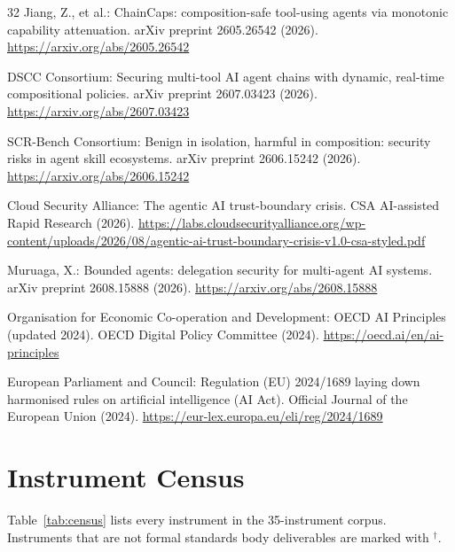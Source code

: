 \documentclass[runningheads]{llncs}
\begin{document}
\begin{thebibliography}{32}
Jiang, Z., et al.: ChainCaps: composition-safe tool-using agents via monotonic capability attenuation. arXiv preprint 2605.26542 (2026). \url{https://arxiv.org/abs/2605.26542}

DSCC Consortium: Securing multi-tool AI agent chains with dynamic, real-time compositional policies. arXiv preprint 2607.03423 (2026). \url{https://arxiv.org/abs/2607.03423}

SCR-Bench Consortium: Benign in isolation, harmful in composition: security risks in agent skill ecosystems. arXiv preprint 2606.15242 (2026). \url{https://arxiv.org/abs/2606.15242}

Cloud Security Alliance: The agentic AI trust-boundary crisis. CSA AI-assisted Rapid Research (2026). \url{https://labs.cloudsecurityalliance.org/wp-content/uploads/2026/08/agentic-ai-trust-boundary-crisis-v1.0-csa-styled.pdf}

Muruaga, X.: Bounded agents: delegation security for multi-agent AI systems. arXiv preprint 2608.15888 (2026). \url{https://arxiv.org/abs/2608.15888}

Organisation for Economic Co-operation and Development: OECD AI Principles (updated 2024). OECD Digital Policy Committee (2024). \url{https://oecd.ai/en/ai-principles}

European Parliament and Council: Regulation (EU) 2024/1689 laying down harmonised rules on artificial intelligence (AI Act). Official Journal of the European Union (2024). \url{https://eur-lex.europa.eu/eli/reg/2024/1689}

\end{thebibliography}

%
\appendix
\section{Instrument Census}
\label{app:census}

Table~\ref{tab:census} lists every instrument in the 35-instrument corpus. Instruments that are not formal standards body deliverables are marked with $^\dagger$.
\end{document}
